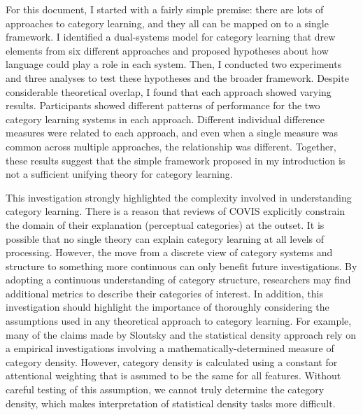 \documentclass[../dissertation.tex]{subfiles}
\begin{document}
	For this document, I started with a fairly simple premise: there are lots of approaches to category learning, and they all can be mapped on to a single framework. I identified a dual-systems model for category learning that drew elements from six different approaches and proposed hypotheses about how language could play a role in each system. Then, I conducted two experiments and three analyses to test these hypotheses and the broader framework. Despite considerable theoretical overlap, I found that each approach showed varying results. Participants showed different patterns of performance for the two category learning systems in each approach. Different individual difference measures were related to each approach, and even when a single measure was common across multiple approaches, the relationship was different. Together, these results suggest that the simple framework proposed in my introduction is not a sufficient unifying theory for category learning. \par 
	This investigation strongly highlighted the complexity involved in understanding category learning. There is a reason that reviews of COVIS explicitly constrain the domain of their explanation (perceptual categories) at the outset. It is possible that no single theory can explain category learning at all levels of processing. However, the move from a discrete view of category systems and structure to something more continuous can only benefit future investigations. By adopting a continuous understanding of category structure, researchers may find additional metrics to describe their categories of interest. In addition, this investigation should highlight the importance of thoroughly considering the assumptions used in any theoretical approach to category learning. For example, many of the claims made by Sloutsky and the statistical density approach rely on a empirical investigations involving a mathematically-determined measure of category density. However, category density is calculated using a constant for attentional weighting that is assumed to be the same for all features. Without careful testing of this assumption, we cannot truly determine the category density, which makes interpretation of statistical density tasks more difficult. \par 
	
\end{document}
